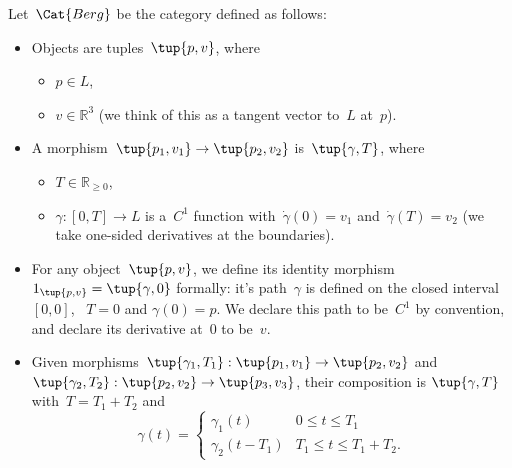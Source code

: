 \begin{definition}
Let~$\Cat{Berg}$ be the category defined as follows:

\begin{itemize}

\item Objects are tuples~$\tup{p, v}$, where
\begin{itemize}
\item $p \in L$,
\item $v \in \mathbb{R}^3$ (we think of this as a tangent vector to~$L$ at~$p$).  
\end{itemize}

\item A morphism~$\tup{p_1, v_1} \rightarrow \tup{p_2, v_2}$ is~$\tup{\gamma, T}$,
where
\begin{itemize}
\item $T \in \mathbb{R}_{\geq 0}$,
\item $\gamma \colon [0, T] \to L$ is a~$C^1$ function with~$\dot \gamma(0) = v_1$ and~$\dot \gamma(T) = v_2$  (we take one-sided derivatives at the boundaries). 
\end{itemize}

\item For any object~$\tup{p, v}$, we define its identity morphism~$1_{\tup{p,v}} = \tup{\gamma, 0}$ formally: it's path~$\gamma$ is defined on the closed interval~$[0,0]$, ~$T= 0$ and $\gamma(0) = p$. We declare this path to be~$C^1$ by convention, and declare its derivative at~$0$ to be~$v$.  

\item Given morphisms~$\tup{\gamma_1, T_1}: \tup{p_1, v_1} \to \tup{p_2, v_2}$ and~$\tup{\gamma_2, T_2}: \tup{p_2, v_2} \to \tup{p_3, v_3}$, their composition is $\tup{\gamma, T}$ with~$T = T_1 + T_2$ and
\begin{equation}
 \gamma(t) = \begin{cases}
 \gamma_1(t) &0 \leq t \leq T_1 \\
\gamma_2(t - T_1) & T_1 \leq t \leq T_1 + T_2.
 \end{cases}
\end{equation} 
\end{itemize}

\end{definition}


